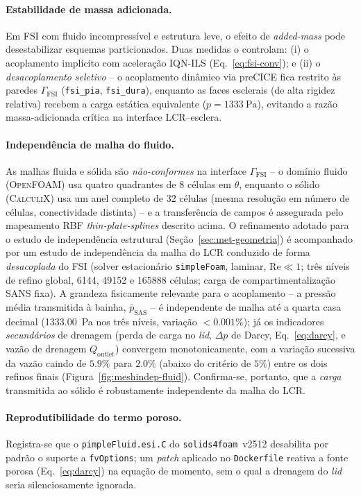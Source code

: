 \paragraph{Estabilidade de massa adicionada.} Em FSI com fluido incompressível e
estrutura leve, o efeito de \emph{added-mass} pode desestabilizar esquemas
particionados. Duas medidas o controlam: (i) o acoplamento implícito com
aceleração IQN-ILS (Eq.~\ref{eq:fsi-conv}); e (ii) o \emph{desacoplamento
seletivo} -- o acoplamento dinâmico via preCICE fica restrito às paredes
$\Gamma_{\mathrm{FSI}}$ (\texttt{fsi\_pia}, \texttt{fsi\_dura}), enquanto as
faces esclerais (de alta rigidez relativa) recebem a carga estática equivalente
($p = \SI{1333}{\pascal}$), evitando a razão massa-adicionada crítica na
interface LCR--esclera.

\paragraph{Independência de malha do fluido.} As malhas fluida e sólida são
\emph{não-conformes} na interface $\Gamma_{\mathrm{FSI}}$ -- o domínio fluido
(\textsc{OpenFOAM}) usa quatro quadrantes de $8$ células em $\theta$, enquanto o
sólido (\textsc{CalculiX}) usa um anel completo de $32$ células (mesma resolução
em número de células, conectividade distinta) -- e a transferência de campos é
assegurada pelo mapeamento RBF \emph{thin-plate-splines} descrito acima. O
refinamento adotado para o estudo de independência estrutural
(Seção~\ref{sec:met-geometria}) é acompanhado por um estudo de independência da
malha do LCR conduzido de forma \emph{desacoplada} do FSI (solver estacionário
\texttt{simpleFoam}, laminar, $\mathrm{Re}\ll 1$; três níveis de refino global,
\num{6144}, \num{49152} e \num{165888} células; carga de compartimentalização
SANS fixa). A grandeza fisicamente relevante para o acoplamento -- a pressão
média transmitida à bainha, $\bar{p}_{\mathrm{SAS}}$ -- é independente de malha
até a quarta casa decimal (\SI{1333.00}{\pascal} nos três níveis, variação
$<0.001\%$); já os indicadores \emph{secundários} de drenagem (perda de carga no
\emph{lid}, $\Delta p$ de Darcy, Eq.~\ref{eq:darcy}, e vazão de drenagem
$Q_{\mathrm{outlet}}$) convergem monotonicamente, com a variação sucessiva da
vazão caindo de $5.9\%$ para $2.0\%$ (abaixo do critério de $5\%$) entre os dois
refinos finais (Figura~\ref{fig:meshindep-fluid}). Confirma-se, portanto, que a
\emph{carga} transmitida ao sólido é robustamente independente da malha do LCR.

\paragraph{Reprodutibilidade do termo poroso.} Registra-se que o
\texttt{pimpleFluid.esi.C} do \texttt{solids4foam}~v2512 desabilita por padrão o
suporte a \texttt{fvOptions}; um \emph{patch} aplicado no \texttt{Dockerfile}
reativa a fonte porosa (Eq.~\ref{eq:darcy}) na equação de momento, sem o qual a
drenagem do \emph{lid} seria silenciosamente ignorada.
